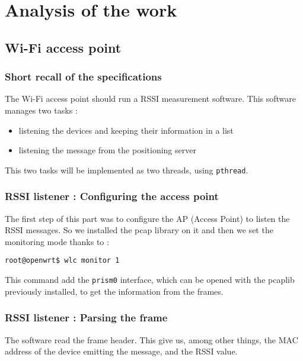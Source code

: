 \section{Analysis of the work}

\subsection{Wi-Fi access point}

\subsubsection{Short recall of the specifications}

The Wi-Fi access point should run a RSSI measurement software. This software
manages two tasks :

\begin{itemize}
    \item listening the devices and keeping their information in a list
    \item listening the message from the positioning server
\end{itemize}

This two tasks will be implemented as two threads, using \verb+pthread+.

\subsubsection{RSSI listener : Configuring the access point}

The first step of this part was to configure the AP (Access Point) to listen
the RSSI messages. So we installed the pcap library on it and then we set the
monitoring mode thanks to :

\begin{verbatim}
root@openwrt$ wlc monitor 1
\end{verbatim}

This command add the \verb+prism0+ interface, which can be opened with the
pcaplib previously installed, to get the information from the frames.

\subsubsection{RSSI listener : Parsing the frame}

The software read the frame header. This give us, among other things,
the MAC address of the device emitting the message, and the RSSI value.

